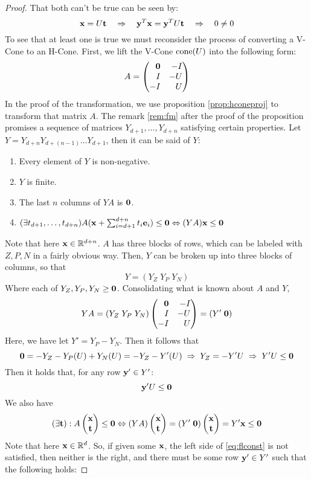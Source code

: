 \begin{proof}  That both can't be true can be seen by:
	\[ \mathbf{x} = U\mathbf{t} \quad\Rightarrow\quad \mathbf{y}^T\mathbf{x} = \mathbf{y}^T U\mathbf{t} \quad\Rightarrow\quad 0 \neq 0 \]
	To see that at least one is true we must reconsider the process of converting a V-Cone to an H-Cone.  First, we lift the V-Cone $\operatorname{cone}(U)$ into the following form:
	\[ A = \begin{pmatrix*}[r] \0 & -I \\ I & -U \\ -I & U \end{pmatrix*}  \]
	In the proof of the transformation, we use proposition \ref{prop:hconeproj} to transform that matrix $A$.  The remark \ref{rem:fm} after the proof of the proposition promises a sequence of matrices $Y_{d+1}, \dots, Y_{d+n}$ satisfying certain properties.  Let $Y = Y_{d+n}Y_{d+(n-1)}\dots Y_{d+1}$, then it can be said of $Y$:
	\begin{enumerate}
		\item Every element of $Y$ is non-negative.
		\item $Y$ is finite.
		\item The last $n$ columns of $YA$ is $\mathbf{0}$.
		\item \((\exists t_{d+1},\dots,t_{d+n})A(\mathbf{x} + \sum_{i=d+1}^{d+n} t_i\mathbf{e}_i) \leq \mathbf{0}
		      \Leftrightarrow (YA)\mathbf{x} \leq \mathbf{0} \)
	\end{enumerate}
	Note that here $\mathbf{x} \in \mathbb{R}^{d+n}$.  $A$ has three blocks of rows, which can be labeled with $Z,P,N$ in a fairly obvious way.  Then, $Y$ can be broken up into three blocks of columns, so that
	\[ Y = (Y_Z \; Y_P \; Y_N) \]
	Where each of $Y_Z,Y_P,Y_N \geq \mathbf{0}$.  Consolidating what is known about $A$ and $Y$,
	\[ YA = (Y_Z \; Y_P \; Y_N) \begin{pmatrix*}[r] \0 & -I \\ I & -U \\ -I & U \end{pmatrix*}
		= (Y' \; \0) \]
	Here, we have let $Y' = Y_P - Y_N$.  Then it follows that
	\[ \mathbf{0} = -Y_Z - Y_P(U) + Y_N(U) = -Y_Z - Y'(U) \;\Rightarrow\; Y_Z = - Y'U
		\;\Rightarrow\; Y'U \leq \mathbf{0} \]
	Then it holds that, for any row $\mathbf{y}' \in Y'$:
	\begin{equation}\label{eq:flneg}
		\mathbf{y}'U \leq \mathbf{0}
	\end{equation}
	We also have
	\begin{equation}\label{eq:flconst}
		(\exists \t) : A \xt \leq \0 \Leftrightarrow (YA)\xt = (Y'\;\0)\xt = Y'\x \leq \0
	\end{equation}
	Note that here $\mathbf{x} \in \mathbb{R}^d$.  So, if given some $\mathbf{x}$, the left side of \eqref{eq:flconst} is not satisfied, then neither is the right, and there must be some row $\mathbf{y}' \in Y'$ such that the following holds:

\end{proof}
